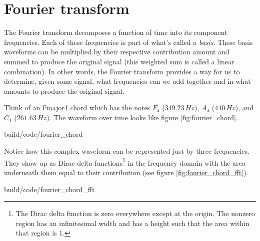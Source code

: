 \section{Fourier transform}

The Fourier transform decomposes a function of time into its component
frequencies. Each of these frequencies is part of what's called a
\textit{basis}. These basis waveforms can be multiplied by their respective
contribution amount and summed to produce the original signal (this weighted sum
is called a linear combination). In other words, the Fourier transform provides
a way for us to determine, given some signal, what frequencies can we add
together and in what amounts to produce the original signal.

Think of an Fmajor4 chord which has the notes $F_4$ ($349.23\,Hz$), $A_4$
($440\,Hz$), and $C_4$ ($261.63\,Hz$). The waveform over time looks like figure
\ref{fig:fourier_chord}.

\begin{svg}{build/code/fourier_chord}
  \caption{Frequency decomposition of Fmajor4 chord}
  \label{fig:fourier_chord}
\end{svg}

Notice how this complex waveform can be represented just by three frequencies.
They show up as Dirac delta functions\footnote{The Dirac delta function is zero
everywhere except at the origin. The nonzero region has an infinitesimal width
and has a height such that the area within that region is $1$.} in the frequency
domain with the area underneath them equal to their contribution (see figure
\ref{fig:fourier_chord_fft}).

\begin{svg}{build/code/fourier_chord_fft}
  \caption{Fourier transform of Fmajor4 chord}
  \label{fig:fourier_chord_fft}
\end{svg}
